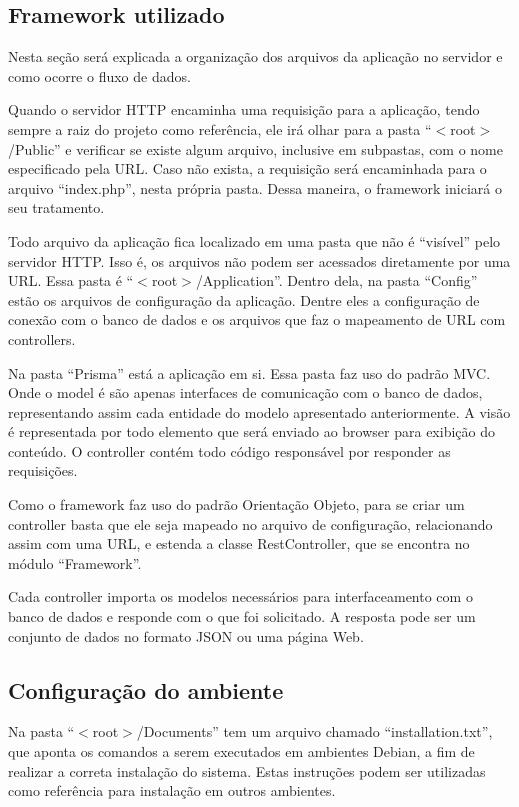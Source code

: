 \documentclass[graduacao,brazil]{ThesisPUC}
\begin{document}
\subsection{Framework utilizado}

Nesta seção será explicada a organização dos arquivos da aplicação no servidor e como ocorre o fluxo de dados.

Quando o servidor HTTP encaminha uma requisição para a aplicação, tendo sempre a raiz do projeto como referência, ele irá olhar para a pasta “$<$root$>$/Public” e verificar se existe algum arquivo, inclusive em subpastas, com o nome especificado pela URL. Caso não exista, a requisição será encaminhada para o arquivo “index.php”, nesta própria pasta. Dessa maneira, o framework iniciará o seu tratamento.

Todo arquivo da aplicação fica localizado em uma pasta que não é “visível” pelo servidor HTTP. Isso é, os arquivos não podem ser acessados diretamente por uma URL. Essa pasta é “$<$root$>$/Application”. Dentro dela, na pasta “Config” estão os arquivos de configuração da aplicação. Dentre eles a configuração de conexão com o banco de dados e os arquivos que faz o mapeamento de URL com controllers.

Na pasta “Prisma” está a aplicação em si. Essa pasta faz uso do padrão MVC. Onde o model é são apenas interfaces de comunicação com o banco de dados, representando assim cada entidade do modelo apresentado anteriormente. A visão é representada por todo elemento que será enviado ao browser para exibição do conteúdo. O controller contém todo código responsável por responder as requisições.

Como o framework faz uso do padrão Orientação Objeto, para se criar um controller basta que ele seja mapeado no arquivo de configuração, relacionando assim com uma URL, e estenda a classe RestController, que se encontra no módulo “Framework”.

Cada controller importa os modelos necessários para interfaceamento com o banco de dados e responde com o que foi solicitado. A resposta pode ser um conjunto de dados no formato JSON ou uma página Web.

\subsection{Configuração do ambiente}

Na pasta “$<$root$>$/Documents” tem um arquivo chamado “installation.txt”, que aponta os comandos a serem executados em ambientes Debian, a fim de realizar a correta instalação do sistema. Estas instruções podem ser utilizadas como referência para instalação em outros ambientes.
\end{document}
